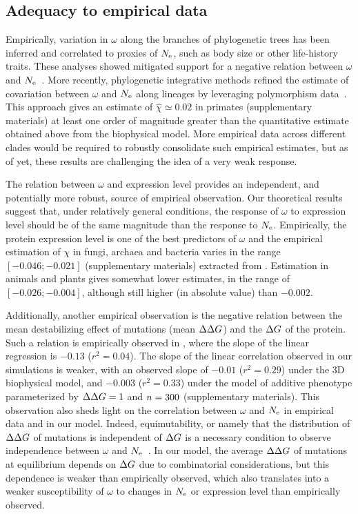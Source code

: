 \documentclass{article}
\begin{document}
\subsection{Adequacy to empirical data}
Empirically, variation in $\omega$ along the branches of phylogenetic trees has been inferred and correlated to proxies of $N_{\text{e}}$, such as body size or other life-history traits.
These analyses showed mitigated support for a negative relation between $\omega$ and $N_{\text{e}}$~\citep{Lanfear2014}.
More recently, phylogenetic integrative methods refined the estimate of covariation between $\omega$ and $N_{\text{e}}$ along lineages by leveraging polymorphism data~\citep{Brevet2019}.
This approach gives an estimate of $\hat{\chi} \simeq 0.02$ in primates (supplementary materials) at least one order of magnitude greater than the quantitative estimate obtained above from the biophysical model.
More empirical data across different clades would be required to robustly consolidate such empirical estimates, but as of yet, these results are challenging the idea of a very weak response.

The relation between $\omega$ and expression level provides an independent, and potentially more robust, source of empirical observation.
Our theoretical results suggest that, under relatively general conditions, the response of $\omega$ to expression level should be of the same magnitude than the response to $N_{\text{e}}$.
Empirically, the protein expression level is one of the best predictors of $\omega$ and the empirical estimation of $\chi$ in fungi, archaea and bacteria varies in the range $[-0.046;-0.021]$ (supplementary materials) extracted from \citet{Zhang2015}.
Estimation in animals and plants gives somewhat lower estimates, in the range of $[-0.026;-0.004]$, although still higher (in absolute value) than $-0.002$.

Additionally, another empirical observation is the negative relation between the mean destabilizing effect of mutations (mean $\Delta \Delta G$) and the $\Delta G$ of the protein.
Such a relation is empirically observed in \citet{Serohijos2012}, where the slope of the linear regression is $-0.13$ ($r^2=0.04$).
The slope of the linear correlation observed in our simulations is weaker, with an observed slope of $-0.01$ ($r^2=0.29$) under the 3D biophysical model, and $-0.003$ ($r^2=0.33$) under the model of additive {phenotype} parameterized by $\Delta \Delta G = 1$ and $n=300$ (supplementary materials).
This observation also sheds light on the correlation between $\omega$ and $N_{\text{e}}$ in empirical data and in our model.
Indeed, equimutability, or namely that the distribution of $\Delta \Delta G$ of mutations is independent of $\Delta G$ is a necessary condition to observe independence between $\omega$ and $N_{\text{e}}$~\citep{Cherry1998}.
In our model, the average $\Delta \Delta G$ of mutations at equilibrium depends on $\Delta G$ due to combinatorial considerations, but this dependence is weaker than empirically observed, which also translates into a weaker susceptibility of $\omega$ to changes in $N_{\text{e}}$ or expression level than empirically observed.
\end{document}
